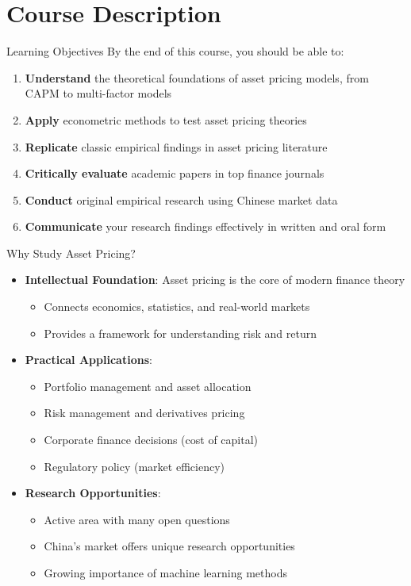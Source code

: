 \documentclass{beamer}
\begin{document}
\section{Course Description}

\begin{frame}{Learning Objectives}
By the end of this course, you should be able to:
\begin{enumerate}
	\item \textbf{Understand} the theoretical foundations of asset pricing models, from CAPM to multi-factor models
	\item \textbf{Apply} econometric methods to test asset pricing theories
	\item \textbf{Replicate} classic empirical findings in asset pricing literature
	\item \textbf{Critically evaluate} academic papers in top finance journals
	\item \textbf{Conduct} original empirical research using Chinese market data
	\item \textbf{Communicate} your research findings effectively in written and oral form
\end{enumerate}
\end{frame}

\begin{frame}{Why Study Asset Pricing?}
	\begin{itemize}
		\item \textbf{Intellectual Foundation}: Asset pricing is the core of modern finance theory
		\begin{itemize}
			\item Connects economics, statistics, and real-world markets
			\item Provides a framework for understanding risk and return
		\end{itemize}
		\item \textbf{Practical Applications}:
		\begin{itemize}
			\item Portfolio management and asset allocation
			\item Risk management and derivatives pricing
			\item Corporate finance decisions (cost of capital)
			\item Regulatory policy (market efficiency)
		\end{itemize}
		\item \textbf{Research Opportunities}:
		\begin{itemize}
			\item Active area with many open questions
			\item China's market offers unique research opportunities
			\item Growing importance of machine learning methods
		\end{itemize}
	\end{itemize}
\end{frame}
\end{document}
